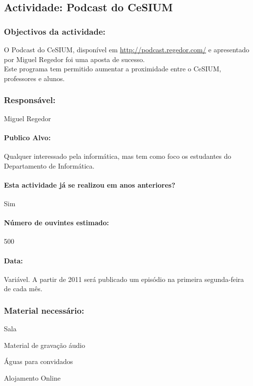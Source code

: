 \subsection{Actividade: Podcast do CeSIUM} 

\subsubsection*{Objectivos da actividade:}
\indent O Podcast do CeSIUM, disponível em \url{http://podcast.regedor.com/} e apresentado por Miguel Regedor foi uma aposta de sucesso.\\
\indent Este programa tem permitido aumentar a proximidade entre o CeSIUM, professores e alunos.\\
\subsubsection*{Responsável:}
\begin{itemizedash}
	\item{Miguel Regedor}
\end{itemizedash}

\paragraph{Publico Alvo: }
Qualquer interessado pela informática, mas tem como foco os estudantes do Departamento de Informática. 

\paragraph{Esta actividade já se realizou em anos anteriores?}
Sim

\paragraph{Número de ouvintes estimado:}
500

\paragraph{Data:} Variável. A partir de 2011 será publicado um episódio na primeira segunda-feira de cada mês.

\subsubsection*{Material necessário:}
\begin{itemizedash}
  \item{Sala}
  \item{Material de gravação áudio}
  \item{Águas para convidados}
  \item{Alojamento Online}
\end{itemizedash}

\vspace{20pt}
